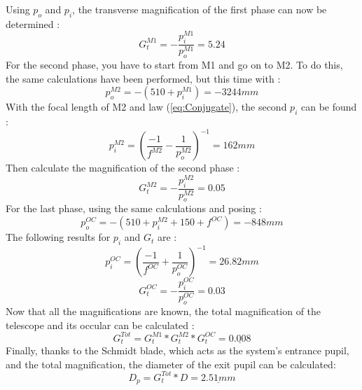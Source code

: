 Using $p_o$ and $p_i$, the transverse magnification of the first phase can now be determined :
\begin{equation}
    G_t^{M1} = -\frac{p_i^{M1}}{p_o^{M1}} = 5.24
\end{equation}
For the second phase, you have to start from M1 and go on to M2. To do this, the same calculations have been performed, but this time with :
\begin{equation}
    p_o^{M2} = -(510 + p_i^{M1}) = -3244mm
\end{equation}
With the focal length of M2 and law (\ref{eq:Conjugate}), the second $p_i$ can be found :
\begin{equation}
    p_i^{M2} = \left(\frac{-1}{f^{M2}}-\frac{1}{p_o^{M2}}\right)^{-1} = 162 mm
\end{equation}
Then calculate the magnification of the second phase :
\begin{equation}
    G_t^{M2} = -\frac{p_i^{M2}}{p_o^{M2}} = 0.05
\end{equation}
For the last phase, using the same calculations and posing :
\begin{equation}
    p_o^{OC} = -(510 + p_i^{M2} + 150 + f^{OC}) = -848mm
\end{equation}
The following results for $p_i$ and $G_t$ are :
\begin{equation}
    p_i^{OC} = \left(\frac{-1}{f^{OC}}+\frac{1}{p_o^{OC}}\right)^{-1} = 26.82 mm
\end{equation}
\begin{equation}
    G_t^{OC} = -\frac{p_i^{OC}}{p_o^{OC}} = 0.03
\end{equation}
Now that all the magnifications are known, the total magnification of the telescope and its occular can be calculated :
\begin{equation}
    G_t^{Tot} = G_t^{M1}*G_t^{M2}*G_t^{OC} = \underline{0.008}
\end{equation}
Finally, thanks to the Schmidt blade, which acts as the system's entrance pupil, and the total magnification,
the diameter of the exit pupil can be calculated:
\begin{equation}
    D_p = G_t^{Tot} * D = \underline{2.51mm}
\end{equation}
